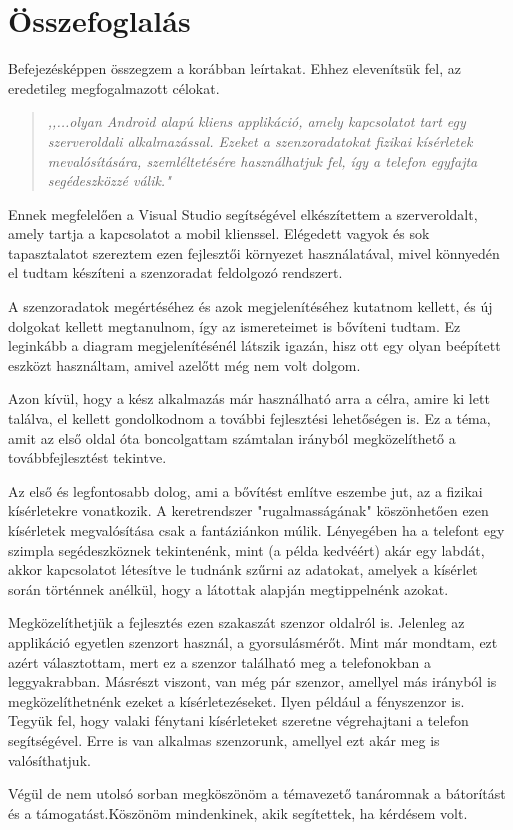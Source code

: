 \documentclass{thesis-ekf}
\theoremstyle{definition}
\theoremstyle{remark}
\begin{document}
\chapter{Összefoglalás}
Befejezésképpen összegzem a korábban leírtakat. Ehhez elevenítsük fel, az eredetileg megfogalmazott célokat.
\begin{quote}
	\it ,,...olyan Android alapú kliens applikáció, amely kapcsolatot tart egy szerveroldali alkalmazással. Ezeket a szenzoradatokat fizikai kísérletek mevalósítására, szemléltetésére használhatjuk fel, így a telefon egyfajta segédeszközzé válik."
\end{quote}
Ennek megfelelően a Visual Studio segítségével elkészítettem a szerveroldalt, amely tartja a kapcsolatot a mobil klienssel. Elégedett vagyok és sok tapasztalatot szereztem ezen fejlesztői környezet használatával, mivel könnyedén el tudtam készíteni a szenzoradat feldolgozó rendszert.
\par A szenzoradatok megértéséhez és azok megjelenítéséhez kutatnom kellett, és új dolgokat kellett megtanulnom, így az ismereteimet is bővíteni tudtam. Ez leginkább a diagram megjelenítésénél látszik igazán, hisz ott egy olyan beépített eszközt használtam, amivel azelőtt még nem volt dolgom.
\par Azon kívül, hogy a kész alkalmazás már használható arra a célra, amire ki lett találva, el kellett gondolkodnom a további fejlesztési lehetőségen is. Ez a téma, amit az első oldal óta boncolgattam számtalan irányból megközelíthető a továbbfejlesztést tekintve.
\par Az első és legfontosabb dolog, ami a bővítést említve eszembe jut, az a fizikai kísérletekre vonatkozik. A keretrendszer "rugalmasságának" köszönhetően ezen kísérletek megvalósítása csak a fantáziánkon múlik. Lényegében ha a telefont egy szimpla segédeszköznek tekintenénk, mint (a példa kedvéért) akár egy labdát, akkor kapcsolatot létesítve le tudnánk szűrni az adatokat, amelyek a kísérlet során történnek anélkül, hogy a látottak alapján megtippelnénk azokat.
\par Megközelíthetjük a fejlesztés ezen szakaszát szenzor oldalról is. Jelenleg az applikáció egyetlen szenzort használ, a gyorsulásmérőt. Mint már mondtam, ezt azért választottam, mert ez a szenzor található meg a telefonokban a leggyakrabban. Másrészt viszont, van még pár szenzor, amellyel más irányból is megközelíthetnénk ezeket a kísérletezéseket. Ilyen például a fényszenzor is. Tegyük fel, hogy valaki fénytani kísérleteket szeretne végrehajtani a telefon segítségével. Erre is van alkalmas szenzorunk, amellyel ezt akár meg is valósíthatjuk.
\par Végül de nem utolsó sorban megköszönöm a témavezető tanáromnak a bátorítást és a támogatást.Köszönöm mindenkinek, akik segítettek, ha kérdésem volt.
\end{document}
